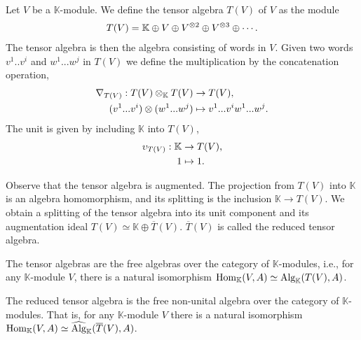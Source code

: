 \documentclass[../thesis.tex]{subfiles}
\begin{document}
            \begin{example}
                Let $V$ be a $\mathbb{K}$-module. We define the tensor algebra $T(V)$ of $V$ as the module
                \begin{align*}
                    T(V) = \mathbb{K}\oplus V\oplus V^{\otimes 2} \oplus V^{\otimes 3} \oplus \cdots\tt{.}
                \end{align*}
                The tensor algebra is then the algebra consisting of words in $V$. Given two words $v^1..v^i$ and $w^1...w^j$ in $T(V)$ we define the multiplication by the concatenation operation,
                \begin{align*}
                    \nabla_{T(V)} : T(V)\otimes_{\mathbb{K}} T(V) & \rightarrow T(V)\tt{,} \\
                    (v^1...v^i)\otimes(w^1...w^j) & \mapsto v^1...v^iw^1...w^j\tt{.}
                \end{align*}
                The unit is given by including $\mathbb{K}$ into $T(V)$,
                \begin{align*}
                    \upsilon_{T(V)} : \mathbb{K} & \rightarrow T(V)\tt{,} \\
                    1 & \mapsto 1\tt{.}
                \end{align*}
            \end{example}

            Observe that the tensor algebra is augmented. The projection from $T(V)$ into $\mathbb{K}$ is an algebra homomorphism, and its splitting is the inclusion $\mathbb{K} \rightarrow T(V)$. We obtain a splitting of the tensor algebra into its unit component and its augmentation ideal $T(V) \simeq \mathbb{K}\oplus\overline{T}(V)$. $\overline{T}(V)$ is called the reduced tensor algebra.

            \begin{proposition}\label{prop: free-tensor}
                The tensor algebras are the free algebras over the category of $\mathbb{K}$-modules, i.e., for any $\mathbb{K}$-module $V$, there is a natural isomorphism $\tt{Hom}_{\mathbb{K}}(V, A)\simeq \tt{Alg}_{\mathbb{K}}(T(V), A)$.

                The reduced tensor algebra is the free non-unital algebra over the category of $\mathbb{K}$-modules. That is, for any $\mathbb{K}$-module $V$ there is a natural isomorphism $\tt{Hom}_{\mathbb{K}}(V, A)\simeq \widehat{\tt{Alg}}_{\mathbb{K}}(\overline{T}(V), A)$.
            \end{proposition}
\end{document}
